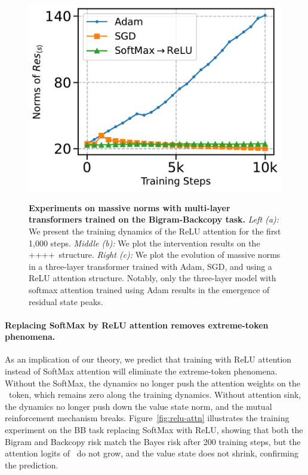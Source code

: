 \begin{figure}
  \begin{minipage}{0.33\textwidth}
      \centering
      \label{fig:sgd}
      \includegraphics[width=\textwidth]{Figures/BBM/adam_vs_sgd.pdf}
  \end{minipage}
    \caption{\small \textbf{Experiments on massive norms with multi-layer transformers trained on the Bigram-Backcopy task.} 
    \textit{Left (a):} We present the training dynamics of the ReLU attention for the first 1,000 steps.
    \textit{Middle (b):} We plot the intervention results on the \attn+\mlp+\attn+\mlp+\mlp~structure.
    \textit{Right (c):} We plot the evolution of massive norms in a three-layer transformer trained with Adam, SGD, and using a ReLU attention structure. Notably, only the three-layer model with softmax attention trained using Adam results in the emergence of residual state peaks. }
\end{figure}

\paragraph{Replacing SoftMax by ReLU attention removes extreme-token phenomena.} As an implication of our theory, we predict that training with ReLU attention instead of SoftMax attention will eliminate the extreme-token phenomena. Without the SoftMax, the dynamics no longer push the attention weights on the \bos~token, which remains zero along the training dynamics. Without attention sink, the dynamics no longer push down the value state norm, and the mutual reinforcement mechanism breaks. Figure~\ref{fig:relu-attn} illustrates the training experiment on the BB task replacing SoftMax with ReLU, showing that both the Bigram and Backcopy risk match the Bayes risk after 200 training steps, but the attention logits of \bos~do not grow, and the value state does not shrink, confirming the prediction. 

